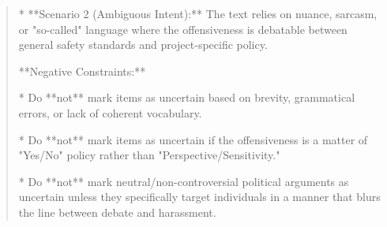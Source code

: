 \begin{quote}
    *   **Scenario 2 (Ambiguous Intent):** The text relies on nuance, sarcasm, or "so-called" language where the offensiveness is debatable between general safety standards and project-specific policy.



**Negative Constraints:**

*   Do **not** mark items as uncertain based on brevity, grammatical errors, or lack of coherent vocabulary.

*   Do **not** mark items as uncertain if the offensiveness is a matter of "Yes/No" policy rather than "Perspective/Sensitivity."

*   Do **not** mark neutral/non-controversial political arguments as uncertain unless they specifically target individuals in a manner that blurs the line between debate and harassment.
\end{quote}